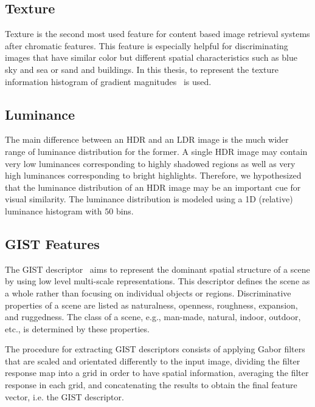 \subsection{Texture}
Texture is the second most used feature for content based image retrieval systems after chromatic features. This feature is especially helpful for discriminating images that have similar color but different spatial characteristics such as blue sky and sea or sand and buildings. In this thesis, to represent the texture information histogram of gradient magnitudes~\cite{sharma2015histogram} is used. 
\subsection{Luminance}
The main difference between an HDR and an LDR image is the much wider range of luminance distribution for the former. A single HDR image may contain very low luminances corresponding to highly shadowed regions as well as very high luminances corresponding to bright highlights. Therefore, we hypothesized that the luminance distribution of an HDR image may be an important cue for visual similarity. The luminance distribution is modeled using a 1D (relative) luminance histogram with $50$ bins.
\subsection{GIST Features}
The GIST descriptor~\cite{oliva2001modeling} aims to represent the dominant spatial structure of a scene by using low level multi-scale representations. This descriptor defines the scene as a whole rather than focusing on individual objects or regions. Discriminative properties of a scene are listed as naturalness, openness, roughness, expansion, and ruggedness. The class of a scene, e.g., man-made, natural, indoor, outdoor, etc., is determined by these properties.

The procedure for extracting GIST descriptors consists of applying Gabor filters that are scaled and orientated differently to the input image, dividing the filter response map into a grid in order to have spatial information, averaging the filter response in each grid, and concatenating the results to obtain the final feature vector, i.e. the GIST descriptor.


